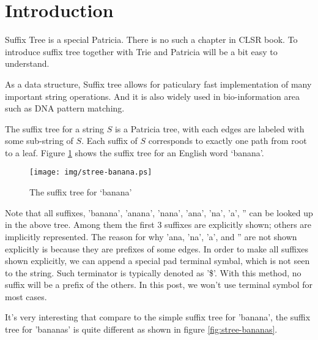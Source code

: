 \documentclass{article}
\begin{document}

\maketitle

\section{Introduction}
\label{introduction}

Suffix Tree is a special Patricia. There is no such a chapter
in CLSR book. To introduce suffix tree together with Trie and Patricia
will be a bit easy to understand. 

As a data structure, Suffix tree allows for paticulary fast implementation
of many important string operations\cite{wiki-suffix-tree}. And it is 
also widely used in bio-information area such as DNA pattern 
matching\cite{ukkonen-presentation}.

The suffix tree for a string $S$ is a Patricia tree, with each edges are labeled
with some sub-string of $S$. Each suffix of $S$ corresponds to exactly one path
from root to a leaf. Figure \ref{fig:stree-banana} shows the suffix tree for
an English word `banana'.

\begin{figure}[htbp]
       \begin{center}
	\texttt{[image: img/stree-banana.ps]}
        \caption{The suffix tree for `banana'} \label{fig:stree-banana}
       \end{center}
\end{figure}

Note that all suffixes, 'banana', 'anana', 'nana', 'ana', 'na', 'a', '' can 
be looked up in the above tree. Among them the first 3 suffixes are explicitly
shown; others are implicitly represented. The reason for why 'ana, 'na', 'a', 
and '' are not shown explicitly is because they are prefixes of some edges.
In order to make all suffixes shown explicitly, we can append a special pad 
terminal symbal, which is not seen to the string. Such terminator is typically
denoted as '\$'. With this method, no suffix will be a prefix of the others.
In this post, we won't use terminal symbol for most cases.

It's very interesting that compare to the simple suffix tree for 'banana', the
suffix tree for 'bananas' is quite different as shown in figure \ref{fig:stree-bananas}.
\end{document}
